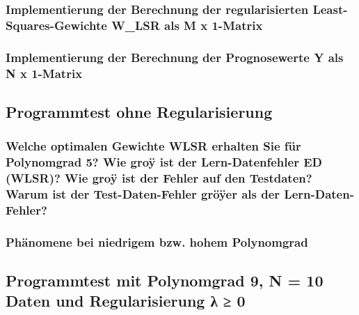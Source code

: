 \subsubsection{Implementierung der Berechnung der regularisierten Least-Squares-Gewichte W_LSR als M x 1-Matrix}

\subsubsection{Implementierung der Berechnung der Prognosewerte Y als N x 1-Matrix}

\subsection{
    Programmtest ohne Regularisierung
}

\subsubsection{Welche optimalen Gewichte WLSR erhalten Sie für Polynomgrad 5? 
                Wie groÿ ist der Lern-Datenfehler ED (WLSR)? 
                Wie groÿ ist der Fehler auf den Testdaten? 
                Warum ist der Test-Daten-Fehler gröÿer als der Lern-Daten-Fehler?}

\subsubsection{Phänomene bei niedrigem bzw. hohem Polynomgrad}


\subsection{
    Programmtest mit Polynomgrad 9, N = 10 Daten und Regularisierung λ ≥ 0
}

